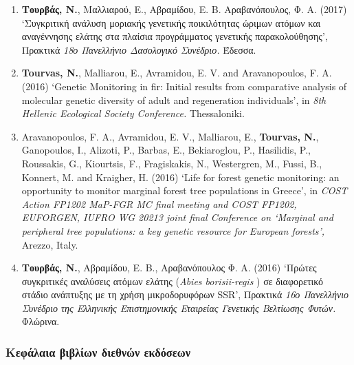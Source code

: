 \documentclass[12pt,]{scrartcl}
\begin{document}
\begin{enumerate}
\leftskip-0.07in  
\item {\textbf{Τουρβάς, Ν.}, Μαλλιαρού, E., Αβραμίδου, Ε. Β. Αραβανόπουλος, Φ. Α. (2017) ‘Συγκριτική ανάλυση μοριακής γενετικής ποικιλότητας ώριμων ατόμων και αναγέννησης ελάτης στα πλαίσια προγράμματος γενετικής παρακολούθησης’, Πρακτικά \textit{18ο Πανελλήνιο Δασολογικό Συνέδριο.} Έδεσσα.}

\leftskip-0.07in  
\item {\textbf{Tourvas, N.}, Malliarou, E., Avramidou, E. V. and Aravanopoulos, F. A. (2016) ‘Genetic Monitoring in fir: Initial results from comparative analysis of molecular genetic diversity of adult and regeneration individuals’, in \textit{8th Hellenic Ecological Society Conference.} Thessaloniki.}

\leftskip-0.07in  
\item {Aravanopoulos, F. A., Avramidou, E. V., Malliarou, E., \textbf{Tourvas, N.}, Ganopoulos, I., Alizoti, P., Barbas, E., Bekiaroglou, P., Hasilidis, P., Roussakis, G., Kiourtsis, F., Fragiskakis, N., Westergren, M., Fussi, B., Konnert, M. and Kraigher, H. (2016) ‘Life for forest genetic monitoring: an opportunity to monitor marginal forest tree populations in Greece’, in \textit{COST Action FP1202 MaP-FGR MC final meeting and COST FP1202, EUFORGEN, IUFRO WG 20213 joint final Conference on ‘Marginal and peripheral tree populations: a key genetic resource for European forests’,} Arezzo, Italy.}

\leftskip-0.07in  
\item {\textbf{Τουρβάς, Ν.}, Αβραμίδου, Ε. Β., Αραβανόπουλος Φ. Α. (2016) ‘Πρώτες συγκριτικές αναλύσεις ατόμων ελάτης (\textit{Abies borisii-regis}
) σε διαφορετικό στάδιο ανάπτυξης με τη χρήση μικροδορυφόρων SSR’, Πρακτικά \textit{16ο Πανελλήνιο Συνέδριο της Ελληνικής Επιστημονικής Εταιρείας Γενετικής Βελτίωσης Φυτών.} Φλώρινα.}

\end{enumerate}


\subsubsection{Κεφάλαια βιβλίων διεθνών εκδόσεων}\label{book-chapters}
\end{document}
